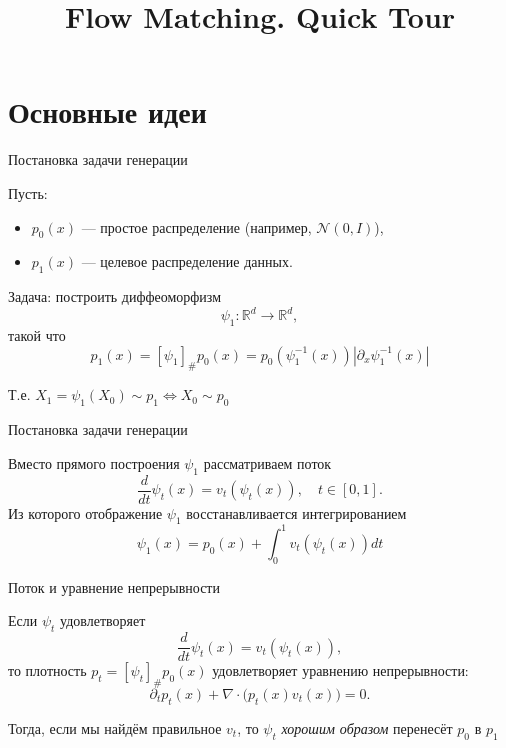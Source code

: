 \documentclass{beamer}
\title{Flow Matching. Quick Tour}
\author{}
\date{}
\begin{document}
\frame{\titlepage}

\section{Основные идеи}

\begin{frame}{Постановка задачи генерации}

Пусть:
\begin{itemize}
    \item $p_0(x)$ — простое распределение (например, $\mathcal N(0,I)$),
    \item $p_1(x)$ — целевое распределение данных.
\end{itemize}
Задача: построить диффеоморфизм
\[
\psi_1 : \mathbb R^d \to \mathbb R^d,
\]
такой что
\[
p_1(x) = [\psi_1]_\# p_0 (x) = p_0(\psi_1^{-1}(x)) |\partial_x \psi_1^{-1}(x)|
\]

Т.е. $X_1 = \psi_1(X_0) \sim p_1 \iff X_0 \sim p_0$ 

\end{frame}

\begin{frame}{Постановка задачи генерации}

Вместо прямого построения $\psi_1$ рассматриваем поток
\[
\frac{d}{dt}\psi_t(x) = v_t(\psi_t(x)), \quad t \in [0,1].
\]
Из которого отображение $\psi_1$ восстанавливается интегрированием
\[
\psi_1(x) = p_0(x) + \int_0^{1} v_t(\psi_t(x)) dt
\]
\end{frame}

\begin{frame}{Поток и уравнение непрерывности}

Если $\psi_t$ удовлетворяет
\[
\frac{d}{dt}\psi_t(x) = v_t(\psi_t(x)),
\]
то плотность $p_t = [\psi_t]_\# p_0 (x)$ удовлетворяет уравнению непрерывности:
\[
\partial_t p_t(x) + \nabla \cdot \big(p_t(x) v_t(x)\big) = 0.
\]

Тогда, если мы найдём правильное $v_t$, то $\psi_t$ \textit{хорошим образом} перенесёт $p_0$ в $p_1$

\end{frame}

\begin{frame}
    \begin{figure}
        \centering
    \end{figure}
\end{frame}
\end{document}
